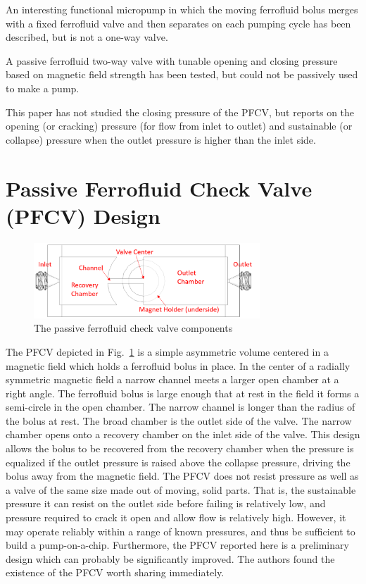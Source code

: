 \documentclass[]{asme2ej}
\begin{document}
An interesting functional micropump in which the
moving ferrofluid bolus merges with a fixed ferrofluid valve and then
separates on each pumping cycle has been described\cite{hatch2001ferrofluidic},
but is not a one-way valve.

A passive ferrofluid two-way valve with tunable
opening and closing pressure based on magnetic
field strength\cite{paschalis2013novel} has been tested,
but could not be passively used to make a pump.

This paper has not studied the closing pressure of the PFCV, but reports on
the opening (or cracking) pressure (for flow from inlet to outlet) and
sustainable (or collapse) pressure
when the outlet pressure is higher than the inlet side.

\section{Passive Ferrofluid Check Valve (PFCV) Design}
\begin{figure}
\centerline{\includegraphics[width=3.34in]{figure/Figure1.png}}
\caption{The passive ferrofluid check valve components}
\label{fig_components}
\end{figure}

The PFCV depicted in Fig.~\ref{fig_components} is a simple asymmetric volume
centered in a magnetic field
which holds a ferrofluid bolus in place.
In the center of a radially symmetric magnetic field
a narrow channel meets a larger open chamber at a right angle.
The ferrofluid bolus is large enough that at rest in the field it
forms a semi-circle in the open chamber. The narrow channel is
longer than the radius of the bolus at rest.
The broad chamber is the outlet side of the valve.
The narrow chamber opens onto a recovery chamber on the inlet
side of the valve.
This design allows the bolus to be recovered from the recovery
chamber when the pressure is equalized if the outlet pressure is
raised above the collapse pressure, driving the bolus away
from the magnetic field.
The PFCV does not resist pressure as well  as a
valve of the same size
made out of moving, solid parts.
That is, the sustainable
pressure it can resist on the outlet side before failing is relatively
low, and pressure required to crack it open and allow flow is
relatively high.
However, it may operate reliably within a range of
known pressures, and thus be sufficient to build a
pump-on-a-chip.
Furthermore, the PFCV reported here is a preliminary design which
can probably be significantly improved.
The authors found the
existence of the PFCV worth sharing immediately.
\end{document}
